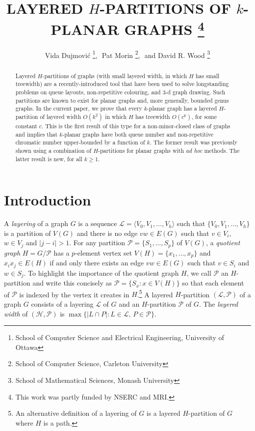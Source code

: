 \documentclass{patmorin}
\title{\MakeUppercase{Layered $H$-Partitions of $k$-Planar Graphs}%
    \thanks{This work was partly funded by NSERC and MRI.}}
\author{Vida Dujmovi\'c%
        \thanks{School of Computer Science and Electrical Engineering,
                University of Ottawa},\,\,
        Pat Morin%
        \thanks{School of Computer Science, Carleton University},\,\, and
        David R. Wood%
        \thanks{School of Mathematical Sciences, Monash University}}
\begin{document}
\maketitle


\begin{abstract}
  Layered $H$-partitions of graphs (with small layered width, in which $H$ has small treewidth) are a recently-introduced tool that have been used to solve longstanding problems on queue layouts, non-repetitive colouring, and 3-d graph drawing.  Such partitions are known to exist for planar graphs and, more generally, bounded genus graphs.  In the current paper, we prove that every $k$-planar graph has a layered $H$-partition of layered width $O(k^2)$ in which $H$ has treewidth $O(c^k)$, for some constant $c$. This is the first result of this type for a non-minor-closed class of graphs and implies that $k$-planar graphs have both queue number and non-repetitive chromatic number upper-bounded by a function of $k$.  The former result was previously shown using a combination of $H$-partitions for planar graphs with \textit{ad hoc} methods. The latter result is new, for all $k\ge 1$.
\end{abstract}

\section{Introduction}

A \emph{layering} of a graph $G$ is a sequence $\mathcal{L}=\langle V_0,V_1,\ldots,V_h\rangle$ such that $\{V_0,V_1,\ldots,V_h\}$ is a partition of $V(G)$ and there is no edge $vw\in E(G)$ such that $v\in V_i$, $w\in V_j$ and $|j-i|>1$.  For any partition $\mathcal{P}=\{S_1,\ldots,S_p\}$ of $V(G)$, a \emph{quotient graph} $H=G/\mathcal{P}$ has a $p$-element vertex set $V(H)=\{x_1,\ldots,x_p\}$ and $x_ix_j\in E(H)$ if and only there exists an edge $vw\in E(G)$ such that $v\in S_i$ and $w\in S_j$. To highlight the importance of the quotient graph $H$, we call $\mathcal{P}$ an $H$-partition and write this concisely as $\mathcal{P}=\{S_x : x\in V(H)\}$ so that each element of $\mathcal{P}$ is indexed by the vertex it creates in $H$.\footnote{An alternative definition of a layering of $G$ is a layered $H$-partition of $G$ where $H$ is a path.}  A layered $H$-partition $(\mathcal{L},\mathcal{P})$ of a graph $G$ consists of a layering $\mathcal{L}$ of $G$ and an $H$-partition $\mathcal{P}$ of $G$. The \emph{layered width} of $(\mathcal{H},\mathcal{P})$ is $\max\{|L\cap P|: L\in\mathcal{L},\, P\in\mathcal{P}\}$.
\end{document}
